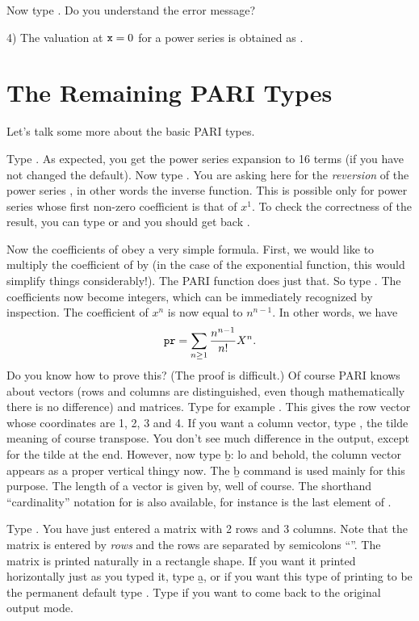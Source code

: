 Now type . Do you understand the error message?

4) The valuation at ${\tt x} = 0$ for a power series  is obtained
as .

\section{The Remaining PARI Types}
Let's talk some more about the basic PARI types.

Type . As expected, you get the power series expansion
to 16 terms (if you have not changed the default). Now type
. You are asking here for the \emph{reversion} of the
power series , in other words the inverse function. This is possible
only for power series whose first non-zero coefficient is that of $x^1$.  To
check the correctness of the result, you can type  or
 and you should get back .

Now the coefficients of  obey a very simple formula. First, we would
like to multiply the coefficient of  by  (in the case of
the exponential function, this would simplify things considerably!). The PARI
function  does just that. So type .
The coefficients now become integers, which can be immediately recognized by
inspection. The coefficient of $x^n$ is now equal to
$n^{n-1}$. In other words, we have
%
$${\tt pr} = \sum_{n\ge1}{{n^{n-1}}\over{n!}} X^{n}.$$
%
Do you know how to prove this? (The proof is difficult.)
\smallskip
%
Of course PARI knows about vectors (rows and columns are distinguished, even
though mathematically there is no difference) and matrices. Type for example
\kbd{[1,2,3,4]}. This gives the row vector whose coordinates are 1, 2, 3 and
4.  If you want a column vector, type \kbd{[1,2,3,4]\til}, the tilde meaning
of course transpose. You don't see much difference in the output, except for
the tilde at the end. However, now type \b{b}: lo and behold, the column
vector appears as a proper vertical thingy now. The \b{b} command is used
mainly for this purpose. The length of a vector is given by, well
 of course. The shorthand ``cardinality'' notation  for
 is also available, for instance  is the last
element of .

Type . You have just entered a matrix with 2 rows and
3 columns. Note that the matrix is entered by \emph{rows} and the rows are
separated by semicolons ``\kbd{;}''. The matrix is printed naturally in a
rectangle shape. If you want it printed horizontally just as you typed it,
type \b{a}, or if you want this type of printing to be the permanent default
type . Type  if you want to
come back to the original output mode.

